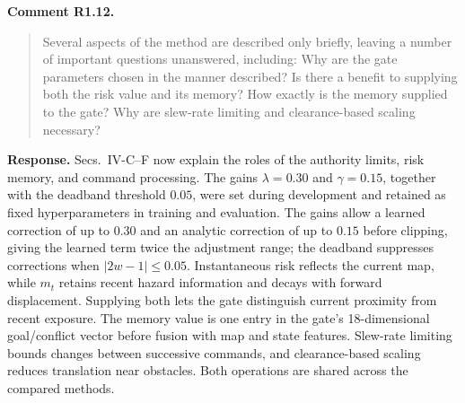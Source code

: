\documentclass[letterpaper,11pt]{article}
\begin{document}
\noindent\textbf{Comment R1.12.}
\begin{quote}\color{reviewgray}
Several aspects of the method are described only briefly, leaving a number of important questions unanswered, including: Why are the gate parameters chosen in the manner described? Is there a benefit to supplying both the risk value and its memory? How exactly is the memory supplied to the gate? Why are slew-rate limiting and clearance-based scaling necessary?
\end{quote}
\noindent\textbf{Response.}
Secs.~IV-C--F now explain the roles of the authority limits, risk memory, and command processing. The gains $\lambda=0.30$ and $\gamma=0.15$, together with the deadband threshold $0.05$, were set during development and retained as fixed hyperparameters in training and evaluation. The gains allow a learned correction of up to $0.30$ and an analytic correction of up to $0.15$ before clipping, giving the learned term twice the adjustment range; the deadband suppresses corrections when $|2w-1|\leq0.05$. Instantaneous risk reflects the current map, while $m_t$ retains recent hazard information and decays with forward displacement. Supplying both lets the gate distinguish current proximity from recent exposure. The memory value is one entry in the gate's 18-dimensional goal/conflict vector before fusion with map and state features. Slew-rate limiting bounds changes between successive commands, and clearance-based scaling reduces translation near obstacles. Both operations are shared across the compared methods.
\par\nopagebreak[4]
\end{document}
